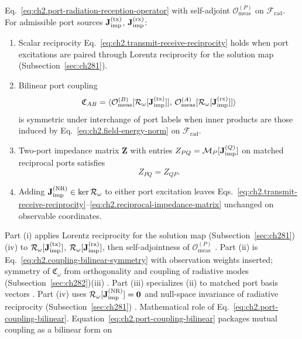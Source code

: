 Eq.~\eqref{eq:ch2.port-radiation-reception-operator} with self-adjoint
\(\mathcal{O}_{\mathrm{meas}}^{(P)}\) on \(\mathcal{F}_{\mathrm{rad}}\). For admissible port
sources \(\mathbf{J}_{\mathrm{imp}}^{\mathrm{(tx)}}\), \(\mathbf{J}_{\mathrm{imp}}^{\mathrm{(rx)}}\):
\begin{enumerate}
\item[(i)] Scalar reciprocity Eq.~\eqref{eq:ch2.transmit-receive-reciprocity} holds when port
excitations are paired through Lorentz reciprocity for the solution map (Subsection~\ref{sec:ch281}).
\item[(ii)] Bilinear port coupling
\begin{equation}
\label{eq:ch2.port-coupling-bilinear}
\mathfrak{C}_{AB}
=
\langle \mathcal{O}_{\mathrm{meas}}^{(B)}[\mathcal{R}_\omega[\mathbf{J}_{\mathrm{imp}}^{\mathrm{(tx)}}]],\,
\mathcal{O}_{\mathrm{meas}}^{(A)}[\mathcal{R}_\omega[\mathbf{J}_{\mathrm{imp}}^{\mathrm{(rx)}}]]\rangle
\end{equation}
is symmetric under interchange of port labels when inner products are those induced by
Eq.~\eqref{eq:ch2.field-energy-norm} on \(\mathcal{F}_{\mathrm{rad}}\).
\item[(iii)] Two-port impedance matrix \(\mathbf{Z}\) with entries
\(Z_{PQ}=\mathcal{M}_P[\mathbf{J}_{\mathrm{imp}}^{(Q)}]\) on matched reciprocal ports satisfies
\begin{equation}
\label{eq:ch2.reciprocal-impedance-matrix}
Z_{PQ}=Z_{QP}.
\end{equation}
\item[(iv)] Adding \(\mathbf{J}_{\mathrm{imp}}^{\mathrm{(NR)}}\in\ker\mathcal{R}_\omega\) to either port excitation
leaves Eqs.~\eqref{eq:ch2.transmit-receive-reciprocity}--\eqref{eq:ch2.reciprocal-impedance-matrix}
unchanged on observable coordinates.
\end{enumerate}
Part (i) applies Lorentz reciprocity for the solution map (Subsection~\ref{sec:ch281})(iv) to
\(\mathcal{R}_\omega[\mathbf{J}_{\mathrm{imp}}^{\mathrm{(tx)}}]\), \(\mathcal{R}_\omega[\mathbf{J}_{\mathrm{imp}}^{\mathrm{(rx)}}]\),
then self-adjointness of \(\mathcal{O}_{\mathrm{meas}}^{(P)}\)
\cite{stratton1941}. Part (ii) is
Eq.~\eqref{eq:ch2.coupling-bilinear-symmetry} with observation weights inserted; symmetry of
\(\mathfrak{C}_\omega\) from orthogonality and coupling of radiative modes (Subsection~\ref{sec:ch282})(iii)
\cite{stratton1941}. Part (iii) specializes (ii) to matched port basis vectors
\cite{harrington2001}. Part (iv) uses
\(\mathcal{R}_\omega[\mathbf{J}_{\mathrm{imp}}^{\mathrm{(NR)}}]=\mathbf{0}\) and
null-space invariance of radiative reciprocity (Subsection~\ref{sec:ch281}) \cite{stratton1941}.
Mathematical role of Eq.~\eqref{eq:ch2.port-coupling-bilinear}. Equation~\eqref{eq:ch2.port-coupling-bilinear} packages mutual coupling as a bilinear form on
